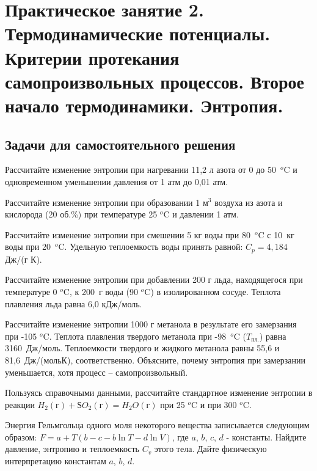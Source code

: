 \chapter{Практическое занятие 2. Термодинамические потенциалы. Критерии протекания самопроизвольных процессов. Второе начало термодинамики. Энтропия.}
\section{Задачи для самостоятельного решения}
\begin{Task}
Рассчитайте изменение энтропии при нагревании 11,2 л азота от 0 до 50~$^{o}$C и одновременном уменьшении давления от 1 атм до 0,01 атм.
\end{Task}
\begin{Task}
Рассчитайте изменение энтропии при образовании 1 м$^{3}$ воздуха из азота и кислорода (20 об.\%) при температуре 25 $^{o}$C и давлении 1 атм.
\end{Task}
\begin{Task}
Рассчитайте изменение энтропии при смешении 5 кг воды при 80~$^{o}$C с 10~кг воды при 20~$^{o}$C. Удельную теплоемкость воды принять равной: $C_{p} = 4,184$ Дж/(г К).
\end{Task}
\begin{Task}
Рассчитайте изменение энтропии при добавлении 200 г льда, находящегося при температуре 0 $^{o}$C, к 200~г воды (90 $^{o}$C) в изолированном сосуде. Теплота плавления льда равна 6,0 кДж/моль.
\end{Task}
\begin{Task}
Рассчитайте изменение энтропии 1000 г метанола в результате его замерзания при -105 $^{o}$C. Теплота плавления твердого метанола при -98~$^{o}$C ($T_{\textrm{пл.}}$) равна 3160~Дж/моль. Теплоемкости твердого и жидкого метанола равны 55,6 и 81,6~Дж/(мольК), соответственно. Объясните, почему энтропия при замерзании уменьшается, хотя процесс -- самопроизвольный.
\end{Task}
\begin{Task}
Пользуясь справочными данными, рассчитайте стандартное изменение энтропии в реакции 
$H_{2}(\textrm{г}) + ЅO_{2}(\textrm{г}) = H_{2}O(\textrm{г})$
при 25 $^{o}$C и при 300 $^{o}$C.
\end{Task}
\begin{Task}
Энергия Гельмгольца одного моля некоторого вещества записывается следующим образом:
$F = a + T(b - c - b\ln T - d \ln V)$,
где $a$, $b$, $c$, $d$ - константы. Найдите давление, энтропию и теплоемкость $C_{v}$ этого тела. Дайте физическую интерпретацию константам $a$, $b$, $d$.
\end{Task}
